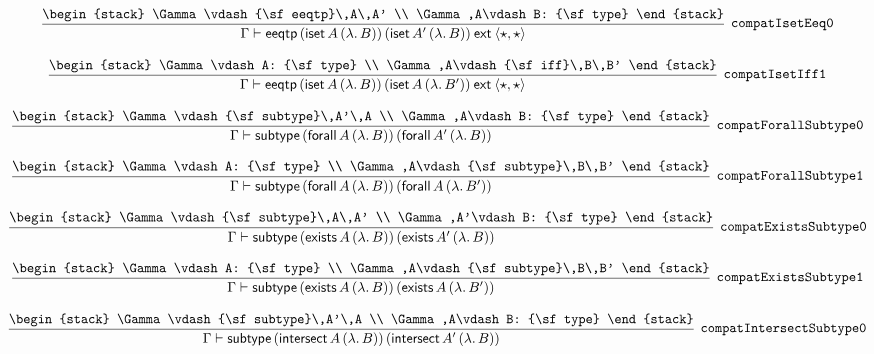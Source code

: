 \[
\infer[{\tt compatIsetEeq0}]{\Gamma \vdash {\sf eeqtp}\,({\sf iset}\,A\,(\lambda .\,B))\,({\sf iset}\,A'\,(\lambda .\,B))\:{\sf ext}\:\langle \star ,\star \rangle }{
\begin{stack}
\Gamma \vdash {\sf eeqtp}\,A\,A'
\\
\Gamma ,A\vdash B: {\sf type}
\end{stack}}
\]

\[
\infer[{\tt compatIsetIff1}]{\Gamma \vdash {\sf eeqtp}\,({\sf iset}\,A\,(\lambda .\,B))\,({\sf iset}\,A\,(\lambda .\,B'))\:{\sf ext}\:\langle \star ,\star \rangle }{
\begin{stack}
\Gamma \vdash A: {\sf type}
\\
\Gamma ,A\vdash {\sf iff}\,B\,B'
\end{stack}}
\]

\[
\infer[{\tt compatForallSubtype0}]{\Gamma \vdash {\sf subtype}\,({\sf forall}\,A\,(\lambda .\,B))\,({\sf forall}\,A'\,(\lambda .\,B))}{
\begin{stack}
\Gamma \vdash {\sf subtype}\,A'\,A
\\
\Gamma ,A\vdash B: {\sf type}
\end{stack}}
\]

\[
\infer[{\tt compatForallSubtype1}]{\Gamma \vdash {\sf subtype}\,({\sf forall}\,A\,(\lambda .\,B))\,({\sf forall}\,A\,(\lambda .\,B'))}{
\begin{stack}
\Gamma \vdash A: {\sf type}
\\
\Gamma ,A\vdash {\sf subtype}\,B\,B'
\end{stack}}
\]

\[
\infer[{\tt compatExistsSubtype0}]{\Gamma \vdash {\sf subtype}\,({\sf exists}\,A\,(\lambda .\,B))\,({\sf exists}\,A'\,(\lambda .\,B))}{
\begin{stack}
\Gamma \vdash {\sf subtype}\,A\,A'
\\
\Gamma ,A'\vdash B: {\sf type}
\end{stack}}
\]

\[
\infer[{\tt compatExistsSubtype1}]{\Gamma \vdash {\sf subtype}\,({\sf exists}\,A\,(\lambda .\,B))\,({\sf exists}\,A\,(\lambda .\,B'))}{
\begin{stack}
\Gamma \vdash A: {\sf type}
\\
\Gamma ,A\vdash {\sf subtype}\,B\,B'
\end{stack}}
\]

\[
\infer[{\tt compatIntersectSubtype0}]{\Gamma \vdash {\sf subtype}\,({\sf intersect}\,A\,(\lambda .\,B))\,({\sf intersect}\,A'\,(\lambda .\,B))}{
\begin{stack}
\Gamma \vdash {\sf subtype}\,A'\,A
\\
\Gamma ,A\vdash B: {\sf type}
\end{stack}}
\]

